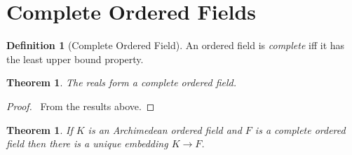 \documentclass{article}
\let\qed\relax
\newtheorem{theorem}[axiom]{Theorem}
\theoremstyle{definition}
\newtheorem{definition}[axiom]{Definition}
\begin{document}
    \section{Complete Ordered Fields}

    \begin{definition}[Complete Ordered Field]
        An ordered field is \emph{complete} iff it has the least upper bound property.
    \end{definition}

    \begin{theorem}
        The reals form a complete ordered field.
    \end{theorem}

    \begin{proof}
        \pf\ From the results above. \qed
    \end{proof}

    \begin{theorem}
        If $K$ is an Archimedean ordered field and $F$ is a complete ordered field then there is a unique
        embedding $K \rightarrow F$.
    \end{theorem}
\end{document}
